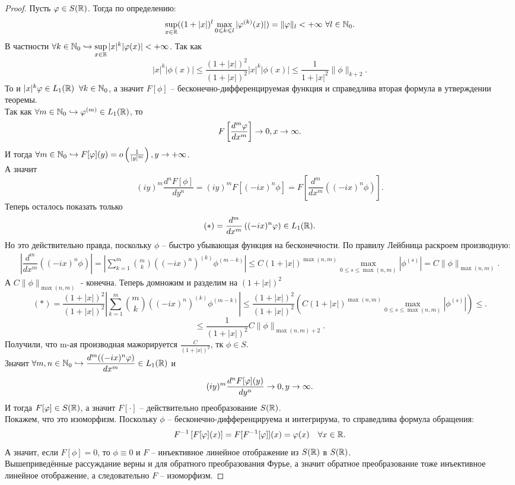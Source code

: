 \begin{proof}
    Пусть $\varphi \in S(\mathbb{R})$. Тогда по определению:
    \[
        \sup_{x \in \mathbb{R}} ((1 + |x|)^l \max\limits_{0 \leqslant k \leqslant l} |\varphi^{(k)}(x)|) = \|\varphi\|_l < +\infty \  \forall l \in \mathbb{N}_0.
    \]
    В частности $\forall k \in \mathbb{N}_0 \hookrightarrow \sup\limits_{x \in \mathbb{R}} |x|^k|\varphi (x)| < +\infty$.
    Так как
    \[
        |x|^k|\phi(x)| \leq \dfrac{(1 + |x|)^2}{(1 + |x|)^2} |x|^k|\phi(x)| \leq \dfrac{1}{1 + |x|^2} \|\phi\|_{k + 2}.
    \]
    То и $|x|^k\varphi \in L_1(\mathbb{R}) \;\; \forall k \in \mathbb{N}_0$, а значит $F[\phi]$ -- бесконечно-дифференцируемая функция и справедлива вторая формула в утверждении теоремы. \\
    Так как $\forall m \in \mathbb{N}_0 \hookrightarrow \varphi^{(m)} \in L_1(\mathbb{R})$, то
    \[
        F\left[\dfrac{d^m \varphi}{dx^m}\right] \rightarrow 0, x \rightarrow \infty.
    \]
    И тогда $\forall m \in \mathbb{N}_0 \hookrightarrow F[\varphi](y) = o\left(\frac{1}{|y|^m}\right), y \rightarrow +\infty$. \\
    А значит
    \[
        (iy)^m \dfrac{d^n F[\phi]}{dy^n} = (iy)^m F[(-ix)^n \phi] = F\left[\dfrac{d^m}{dx^m}((-ix)^n \phi)\right].
    \]
    Теперь осталось показать только
    \[
        (*) = \dfrac{d^m}{dx^m}\left((-ix)^n \varphi\right) \in L_1(\mathbb{R}).
    \]
    Но это действительно правда, поскольку $\phi$ -- быстро убывающая функция на бесконечности. По правилу Лейбница раскроем производную:
    \begin{multline*}
        \left|\dfrac{d^m}{dx^m}((-ix)^n \phi)\right| = \left|\sum\limits_{k = 1}^m \binom{m}{k}((-ix)^n)^{(k)} \phi^{(m - k)}\right| \leq C (1 + |x|)^{\max(n, m)}\max\limits_{0 \leq s \leq \max(n,m)} |\phi^{(s)}| = C \|\phi\|_{\max(n,m)}.
    \end{multline*}
    А $C \|\phi\|_{\max(n,m)}$ - конечна. Теперь домножим и разделим на $(1 + |x|)^2$
    \[
        (*) = \frac{(1 + |x|)^2}{(1 + |x|)^2} \left|\sum\limits_{k = 1}^m \binom{m}{k}((-ix)^n)^{(k)} \phi^{(m - k)}\right| \leq \frac{(1 + |x|)^2}{(1 + |x|)^2} \left(C (1 + |x|)^{\max(n, m)}\max\limits_{0 \leq s \leq \max(n,m)} |\phi^{(s)}|\right) \leq.
    \]
    \[
        \leq \frac{1}{(1 + |x|)^2} C \|\phi\|_{\max(n,m)+2}.
    \]
    Получили, что m-ая производная мажорируется $\frac{C}{(1+|x|)^2}$, тк $\phi \in S$. \\ Значит $\forall m, n \in \mathbb{N}_0 \hookrightarrow \dfrac{d^m ((-ix)^n \varphi)}{dx^m} \in L_1(\mathbb{R})$ и
    \[
        (iy)^m \dfrac{d^n F[\varphi](y)}{dy^n} \rightarrow 0, y \rightarrow \infty.
    \]
    И тогда $F[\varphi] \in S(\mathbb{R})$, а значит $F[\cdot]$ -- действительно преобразование $S(\mathbb{R})$. \\
    Покажем, что это изоморфизм.
    Поскольку $\phi$ -- бесконечно-дифференцируема и интегрирума, то справедлива формула обращения:
    \[
        F^{-1}\left[F[\varphi](x)\right] = F[F^{-1}[\varphi]](x) = \varphi(x) \quad \forall x \in \mathbb{R}.
    \]
    А значит, если $F[\phi] = 0$, то $\phi \equiv 0$ и $F$ -- инъективное линейное отображение из $S(\mathbb{R})$ в $S(\mathbb{R})$. \\
    Вышеприведённые рассуждание верны и для обратного преобразования Фурье, а значит обратное преобразование тоже инъективное линейное отображение, а следовательно $F$ -- изоморфизм.
\end{proof}
